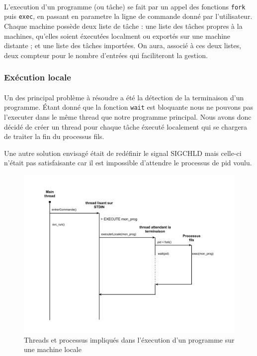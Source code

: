     \paragraph{}
    L'execution d'un programme (ou tâche) se fait par un appel des 
    fonctions \verb"fork" puis \verb"exec", en passant en parametre la ligne de
    commande donné par l'utilisateur. Chaque machine possède deux liste
    de tâche : une liste des tâches propres à la machines, qu'elles 
    soient éxecutées localment ou exportés sur une machine distante ; et
    une liste des tâches importées. On aura, associé à ces deux listes, 
    deux compteur pour le nombre d'entrées qui faciliteront la gestion.
    
    \subsubsection{Exécution locale}
    
      \paragraph{}    
      Un des principal problème à résoudre a été la détection de la
      terminaison d'un programme. Étant donné que la fonction \verb"wait" est
      bloquante nous ne pouvons pas l'executer dans le même thread que
      notre programme principal. Nous avons donc décidé de créer un
      thread pour chaque tâche éxecuté localement qui se chargera de 
      traiter la fin du processus fils. 
      
      Une autre solution envisagé était de redéfinir le signal
      SIGCHLD mais celle-ci n'était pas satisfaisante car il est
      impossible d'attendre le processus de pid voulu.

      
      \begin{figure}[h!]
        \centering
        \includegraphics[scale=0.6]{img/execution_locale.pdf}
        \caption{Threads et processus impliqués dans l'éxecution d'un 
                 programme sur une machine locale}
      \end{figure}
    
